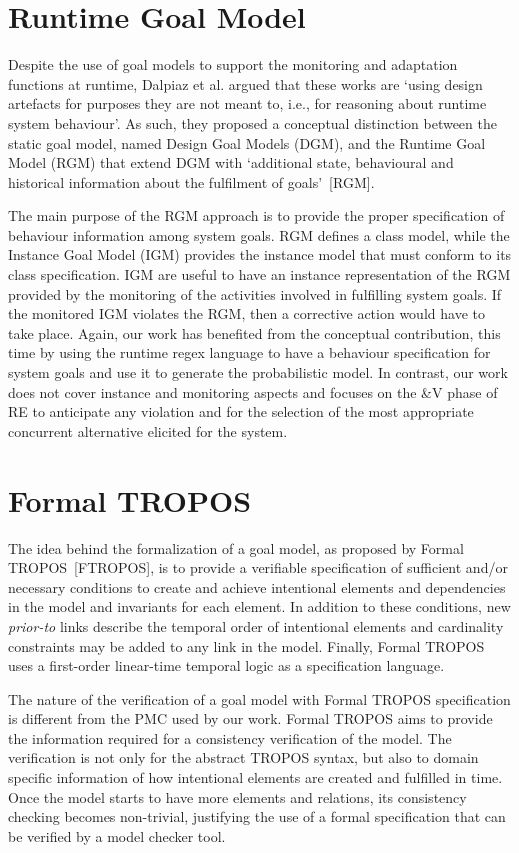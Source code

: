 \section{Runtime Goal Model}

Despite the use of goal models to support the monitoring and adaptation functions at runtime, Dalpiaz et al. argued that these works are `using design artefacts for purposes they are not meant to, i.e., for reasoning about runtime system behaviour'. As such, they proposed a conceptual distinction between the static goal model, named Design Goal Models (DGM), and the Runtime Goal Model (RGM) that extend DGM with `additional state, behavioural and historical information about the fulfilment of goals'~[RGM].

The main purpose of the RGM approach is to provide the proper specification of behaviour information among system goals. RGM defines a class model, while the Instance Goal Model (IGM) provides the instance model that must conform to its class specification. IGM are useful to have an instance representation of the RGM provided by the monitoring of the activities involved in fulfilling system goals. If the monitored IGM violates the RGM, then a corrective action would have to take place. Again, our work has benefited from the conceptual contribution, this time by using the runtime regex language to have a behaviour specification for system goals and use it to generate the probabilistic model. In contrast, our work does not cover instance and monitoring aspects and focuses on the \&V phase of RE to anticipate any violation and for the selection of the most appropriate concurrent alternative elicited for the system.

\section{Formal TROPOS}

The idea behind the formalization of a goal model, as proposed by Formal TROPOS~[FTROPOS], is to provide a verifiable specification of sufficient and/or necessary conditions to create and achieve intentional elements and dependencies in the model and invariants for each element. In addition to these conditions, new \textit{prior-to} links describe the temporal order of intentional elements and cardinality constraints may be added to any link in the model. Finally, Formal TROPOS uses a first-order linear-time temporal logic as a specification language.

The nature of the verification of a goal model with Formal TROPOS specification is different from the PMC used by our work. Formal TROPOS aims to provide the information required for a consistency verification of the model. The verification is not only for the abstract TROPOS syntax, but also to domain specific information of how intentional elements are created and fulfilled in time. Once the model starts to have more elements and relations, its consistency checking becomes non-trivial, justifying the use of a formal specification that can be verified by a model checker tool. 

